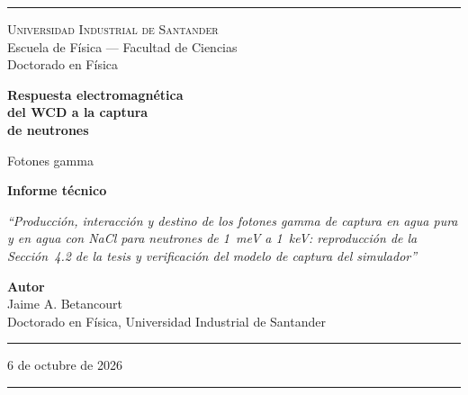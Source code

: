 \documentclass[11pt,a4paper]{article}
\begin{document}
\pagestyle{empty}

\begin{titlepage}
\begin{center}
\vspace*{0.5cm}
\textcolor{reglaColor}{\rule{\linewidth}{1.2pt}}

\vspace{1.3cm}
{\Large\scshape Universidad Industrial de Santander}\\[0.2cm]
{\large Escuela de Física --- Facultad de Ciencias}\\[0.2cm]
{\large Doctorado en Física}

\vspace{2.2cm}
{\Huge\bfseries\color{tituloColor} Respuesta electromagnética\\[0.3cm] del WCD a la captura\\[0.3cm] de neutrones}

\vspace{1.2cm}
{\Large Fotones gamma}

\vspace{1.4cm}
{\large\textbf{Informe técnico}}

\vspace{0.6cm}
\begin{minipage}{0.82\linewidth}
\centering
\textit{``Producción, interacción y destino de los fotones gamma de captura en agua pura y en agua con NaCl para neutrones de 1~meV a 1~keV: reproducción de la Sección~4.2 de la tesis y verificación del modelo de captura del simulador''}
\end{minipage}

\vfill
{\large\textbf{Autor}}\\[0.15cm]
Jaime A. Betancourt\\[0.1cm]
Doctorado en Física, Universidad Industrial de Santander

\vspace{1.2cm}
\textcolor{reglaColor}{\rule{0.5\linewidth}{0.6pt}}

\vspace{1cm}
6 de octubre de 2026

\vspace{1cm}
\textcolor{reglaColor}{\rule{\linewidth}{1.2pt}}
\end{center}
\end{titlepage}

\pagestyle{plain}
\end{document}
